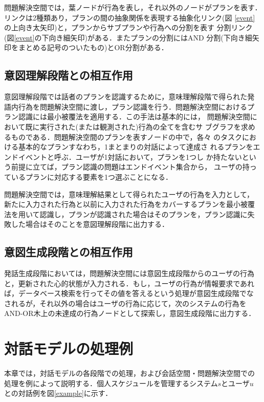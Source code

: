 問題解決空間では，葉ノードが行為を表し，それ以外のノードがプランを表す．
リンクは2種類あり，プランの間の抽象関係を表現する抽象化リンク(図
\ref{event}の上向き太矢印)と，プランからサブプランや行為への分割を表す
分割リンク(図\ref{event}の下向き細矢印)がある．またプランの分割にはAND
分割(下向き細矢印をまとめる記号のついたもの)とOR分割がある．

\subsection{意図理解段階との相互作用}

意図理解段階では話者のプランを認識するために，意味理解段階で得られた発
語内行為を問題解決空間に渡し，プラン認識を行う．問題解決空間におけるプ
ラン認識には最小被覆法\cite{kautz90}を適用する．この手法は基本的には，
問題解決空間において既に実行された(または観測された)行為の全てを含むサ
ブグラフを求めるものである．問題解決空間のプランを表すノードの中で，各々
のタスクにおける基本的なプランすなわち，1まとまりの対話によって達成さ
れるプランをエンドイベントと呼ぶ．ユーザが1対話において，プランを1つし
か持たないという前提に立てば，プラン認識の問題はエンドイベント集合から，
ユーザの持っているプランに対応する要素を1つ選ぶことになる．

問題解決空間では，意味理解結果として得られたユーザの行為を入力として，
新たに入力された行為と以前に入力された行為をカバーするプランを最小被覆
法を用いて認識し，プランが認識された場合はそのプランを，プラン認識に失
敗した場合はそのことを意図理解段階に出力する．

\subsection{意図生成段階との相互作用}

発話生成段階においては，問題解決空間には意図生成段階からのユーザの行為
と，更新された心的状態が入力される．もし，ユーザの行為が情報要求であれ
ば，データベース検索を行ってその値を答えるという処理が意図生成段階でな
されるが，それ以外の場合はユーザの行為に応じて，次のシステムの行為を
AND-OR木上の未達成の行為ノードとして探索し，意図生成段階に出力する．

\section{対話モデルの処理例}

本章では，対話モデルの各段階での処理，および会話空間・問題解決空間での
処理を例によって説明する．個人スケジュールを管理するシステム$s$とユーザ$u$
との対話例を図\ref{example}に示す．

